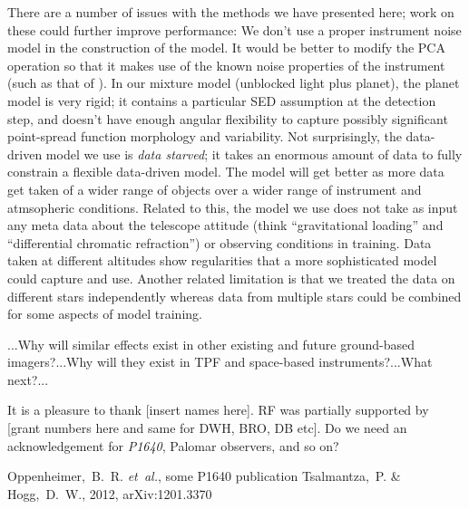 \documentclass[12pt,pdftex,preprint]{aastex}
\newcommand{\etal}{\textit{et~al.}}
\newcommand{\project}[1]{\textsl{#1}}
\begin{document}
There are a number of issues with the methods we have presented here;
work on these could further improve performance: We don't use a proper
instrument noise model in the construction of the model.  It would be
better to modify the PCA operation so that it makes use of the known
noise properties of the instrument (such as that of \citealt{hmf}).
In our mixture model (unblocked light plus planet), the planet model
is very rigid; it contains a particular SED assumption at the
detection step, and doesn't have enough angular flexibility to capture
possibly significant point-spread function morphology and variability.
Not surprisingly, the data-driven model we use is \emph{data starved};
it takes an enormous amount of data to fully constrain a flexible
data-driven model.  The model will get better as more data get taken
of a wider range of objects over a wider range of instrument and
atmsopheric conditions.  Related to this, the model we use does not
take as input any meta data about the telescope attitude (think
``gravitational loading'' and ``differential chromatic refraction'')
or observing conditions in training.  Data taken at different
altitudes show regularities that a more sophisticated model could
capture and use.  Another related limitation is that we treated the
data on different stars independently whereas data from multiple stars
could be combined for some aspects of model training.

...Why will similar effects exist in other existing and future
ground-based imagers?...Why will they exist in TPF and space-based
instruments?...What next?...

\acknowledgements It is a pleasure to thank [insert names here].  RF
was partially supported by [grant numbers here and same for DWH, BRO,
  DB etc].  Do we need an acknowledgement for \project{P1640}, Palomar
observers, and so on?

\begin{thebibliography}{}
\bibitem[Oppenheimer \etal(1875)]{p1640}
Oppenheimer,~B.~R. \etal, some P1640 publication
Tsalmantza,~P. \& Hogg,~D.~W., 2012, arXiv:1201.3370
\end{thebibliography}
\end{document}
